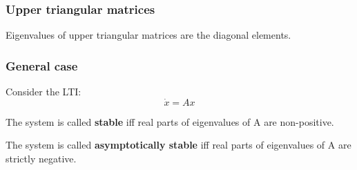 \subsubsection{Upper triangular matrices}

\begin{tcolorbox}[colback=white]
    Eigenvalues of upper triangular matrices are the diagonal elements.
\end{tcolorbox}
    

\subsubsection{General case}

Consider the LTI:
\[\dot x = Ax\]

\begin{tcolorbox}[colback=green!10,colframe=green!50!black]
    The system is called \textbf{stable} iff real parts of eigenvalues of A are non-positive.
\end{tcolorbox}

\begin{tcolorbox}[colback=green!10,colframe=green!50!black]
    The system is called \textbf{asymptotically stable} iff real parts of eigenvalues of A are  strictly negative. 
\end{tcolorbox}